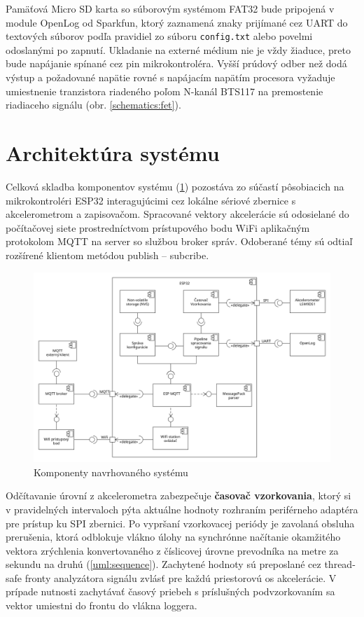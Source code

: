 Pamäťová Micro SD karta so súborovým systémom FAT32 bude pripojená v module OpenLog od Sparkfun, ktorý zaznamená znaky
prijímané cez UART do textových súborov podľa pravidiel zo súboru \verb|config.txt| alebo povelmi odoslanými
po zapnutí. Ukladanie na externé médium nie je vždy žiaduce, preto bude napájanie spínané cez pin mikrokontroléra. Vyšší
prúdový odber než dodá výstup a požadované napätie rovné s napájacím napätím procesora vyžaduje umiestnenie tranzistora riadeného
poľom N-kanál BTS117 na premostenie riadiaceho signálu (obr. \ref{schematics:fet}).


\section{Architektúra systému}
Celková skladba komponentov systému (\ref{uml:component}) pozostáva zo súčastí pôsobiacich na mikrokontroléri ESP32
interagujúcimi cez lokálne sériové zbernice s akcelerometrom a zapisovačom. Spracované vektory akcelerácie sú
odosielané do počítačovej siete prostredníctvom prístupového bodu WiFi aplikačným protokolom MQTT
na server so službou broker správ. Odoberané témy sú odtiaľ rozšírené klientom metódou publish -- subcribe.
\begin{figure}[h]
	\centering
	\includegraphics[width=\textwidth]{figures/design/components.png}
	\caption{Komponenty navrhovaného systému}
	\label{uml:component}
\end{figure}

Odčítavanie úrovní z akcelerometra zabezpečuje \textbf{časovač vzorkovania}, ktorý si v pravidelných intervaloch pýta aktuálne
hodnoty rozhraním periférneho adaptéra pre prístup ku SPI zbernici. Po vypršaní vzorkovacej periódy je zavolaná obsluha prerušenia, ktorá
odblokuje vlákno úlohy na synchrónne načítanie okamžitého vektora zrýchlenia konvertovaného z číslicovej úrovne prevodníka na metre za
sekundu na druhú (\ref{uml:sequence}). Zachytené hodnoty sú preposlané cez thread-safe fronty analyzátora signálu zvlásť pre každú
priestorovú os akcelerácie. V prípade nutnosti zachytávať časový priebeh s príslušných podvzorkovaním sa vektor umiestni do frontu do
vlákna loggera.

